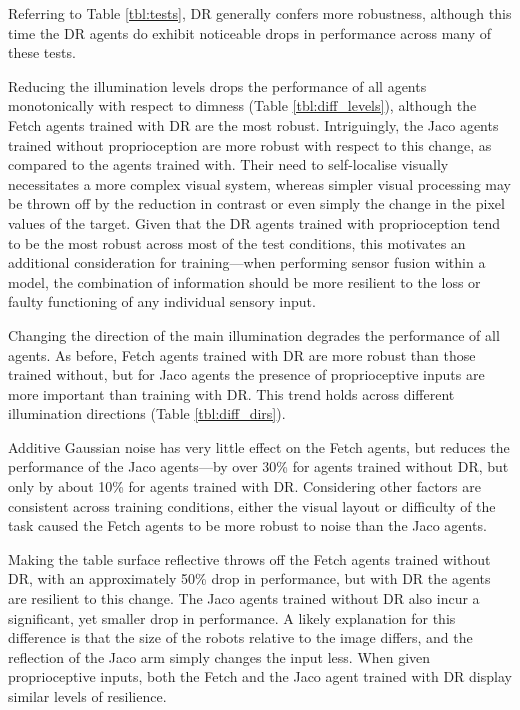 Referring to Table \ref{tbl:tests}, DR generally confers more
robustness, although this time the DR agents do exhibit noticeable drops
in performance across many of these tests.

Reducing the illumination levels drops the performance of all agents
monotonically with respect to dimness (Table \ref{tbl:diff_levels}),
although the Fetch agents trained with DR are the most robust.
Intriguingly, the Jaco agents trained without proprioception are more
robust with respect to this change, as compared to the agents trained
with. Their need to self-localise visually necessitates a more complex
visual system, whereas simpler visual processing may be thrown off by
the reduction in contrast or even simply the change in the pixel values
of the target. Given that the DR agents trained with proprioception tend
to be the most robust across most of the test conditions, this motivates
an additional consideration for training---when performing sensor fusion
within a model, the combination of information should be more resilient
to the loss or faulty functioning of any individual sensory input.

Changing the direction of the main illumination degrades the performance
of all agents. As before, Fetch agents trained with DR are more robust
than those trained without, but for Jaco agents the presence of
proprioceptive inputs are more important than training with DR. This
trend holds across different illumination directions (Table
\ref{tbl:diff_dirs}).

Additive Gaussian noise has very little effect on the Fetch agents, but
reduces the performance of the Jaco agents---by over 30\% for agents
trained without DR, but only by about 10\% for agents trained with DR.
Considering other factors are consistent across training conditions,
either the visual layout or difficulty of the task caused the Fetch
agents to be more robust to noise than the Jaco agents.

Making the table surface reflective throws off the Fetch agents trained
without DR, with an approximately 50\% drop in performance, but with DR
the agents are resilient to this change. The Jaco agents trained without
DR also incur a significant, yet smaller drop in performance. A likely
explanation for this difference is that the size of the robots relative
to the image differs, and the reflection of the Jaco arm simply changes
the input less. When given proprioceptive inputs, both the Fetch and the
Jaco agent trained with DR display similar levels of resilience.

